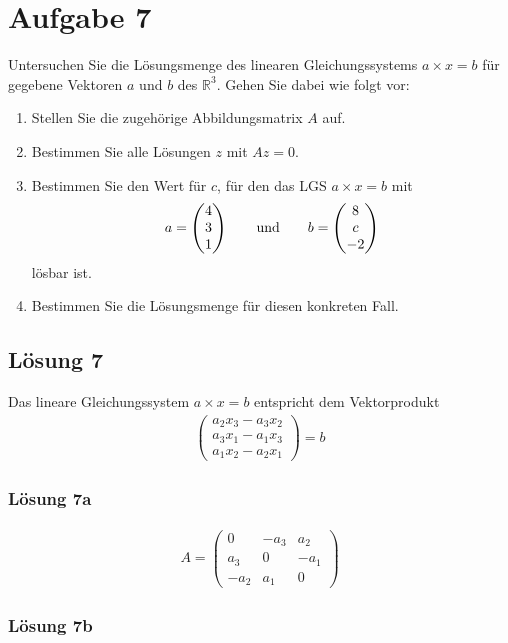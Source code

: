 \documentclass[main.tex]{subfiles}
\begin{document}
\section{Aufgabe 7}
Untersuchen Sie die Lösungsmenge des linearen Gleichungssystems $a\times x = b$ für gegebene Vektoren $a$ und $b$ des $\mathbb{R}^3$. Gehen Sie dabei wie folgt vor:
\begin{enumerate}
    \item Stellen Sie die zugehörige Abbildungsmatrix $A$ auf.
    \item Bestimmen Sie alle Lösungen $z$ mit $Az=0$.
    \item Bestimmen Sie den Wert für $c$, für den das LGS $a\times x =b$ mit
          $$
            a = \vektor{4 \\ 3 \\ 1} \qquad \text{und} \qquad b = \vektor{8 \\ c \\ -2}
          $$
          lösbar ist.
    \item Bestimmen Sie die Lösungsmenge für diesen konkreten Fall.
\end{enumerate}

\subsection{Lösung 7}
Das lineare Gleichungssystem $a\times x = b$ entspricht dem Vektorprodukt
\begin{align*}
	\begin{pmatrix}
		a_2x_3-a_3x_2\\
		a_3x_1-a_1x_3\\
		a_1x_2-a_2x_1
	\end{pmatrix} = b
\end{align*}

\subsubsection{Lösung 7a}
\begin{align*}
		A = \begin{pmatrix}
			0 & -a_3 & a_2\\
			a_3 & 0 & -a_1\\
			-a_2 & a_1 & 0
		\end{pmatrix}
	\end{align*}
\subsubsection{Lösung 7b}
\end{document}
